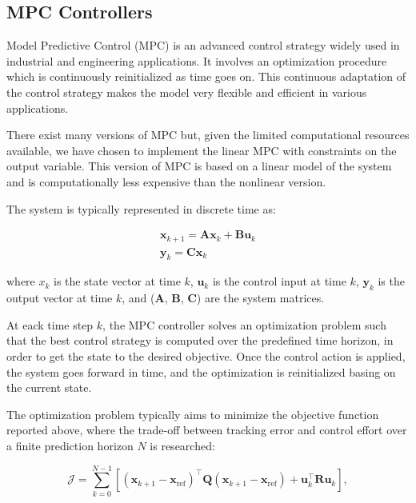 \subsection{MPC Controllers}
\label{subsec:mpc_controllers}

Model Predictive Control (MPC) is an advanced control strategy widely used in industrial and engineering applications. It involves an optimization procedure which is continuously reinitialized as time goes on. This continuous adaptation of the control strategy makes the model very flexible and efficient in various applications.

There exist many versions of MPC but, given the limited computational resources available, we have chosen to implement the linear MPC with constraints on the output variable. This version of MPC is based on a linear model of the system and is computationally less expensive than the nonlinear version.

The system is typically represented in discrete time as:

\begin{equation}
    \begin{aligned}
        \mathbf{x}_{k+1}=\mathbf{A}\mathbf{x}_{k}+\mathbf{B}\mathbf{u}_{k} \\
        \mathbf{y}_{k}=\mathbf{C}\mathbf{x}_{k}
    \end{aligned}
\end{equation}

where $x_k$ is the state vector at time $k$, $\mathbf{u}_k$ is the control input at time $k$, $\mathbf{y}_k$ is the output vector at time $k$, and ($\mathbf{A}$, $\mathbf{B}$, $\mathbf{C}$) are the system matrices.

At eack time step $k$, the MPC controller solves an optimization problem such that the best control strategy is computed over the predefined time horizon, in order to get the state to the desired objective. Once the control action is applied, the system goes forward in time, and the optimization is reinitialized basing on the current state.

The optimization problem typically aims to minimize the objective function reported above, where the trade-off between tracking error and control effort over a finite prediction horizon $N$ is researched:

\begin{equation}
    \mathcal{J} = \sum_{k=0}^{N-1} \left[ (\mathbf{x}_{k+1} - \mathbf{x}_{\text{ref}})^\top \mathbf{Q} (\mathbf{x}_{k+1} - \mathbf{x}_{\text{ref}}) + \mathbf{u}_k^\top \mathbf{R} \mathbf{u}_k \right],
    \label{eq:mpc_objective}
\end{equation}

